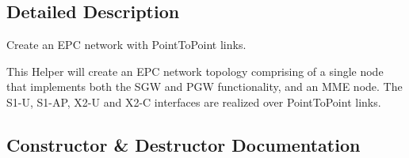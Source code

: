 \subsection{Detailed Description}
Create an E\+PC network with Point\+To\+Point links. 

This Helper will create an E\+PC network topology comprising of a single node that implements both the S\+GW and P\+GW functionality, and an M\+ME node. The S1-\/U, S1-\/\+AP, X2-\/U and X2-\/C interfaces are realized over Point\+To\+Point links. 

\subsection{Constructor \& Destructor Documentation}
